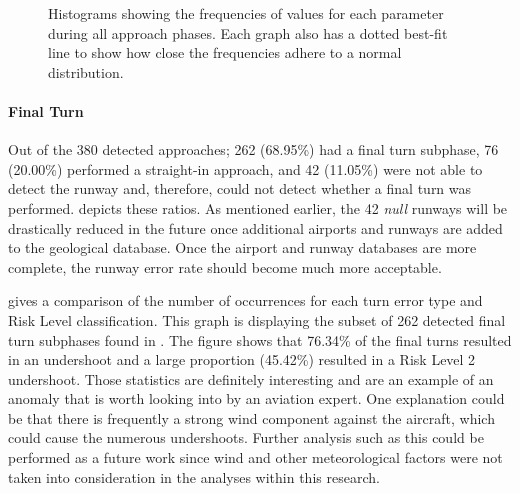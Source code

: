     \begin{figure}
    	\centering
        \hfill%
        
        \hfill%
        \caption{Histograms showing the frequencies of values for each parameter during all approach phases.  Each graph also has a dotted best-fit line to show how close the frequencies adhere to a normal distribution.}
        \label{fig:approach_histograms}
    \end{figure}
    
    
        \paragraph{Final Turn}
        
        	Out of the 380 detected approaches; 262 (68.95\%) had a final turn subphase, 76 (20.00\%) performed a straight-in approach, and 42 (11.05\%) were not able to detect the runway and, therefore, could not detect whether a final turn was performed.   depicts these ratios.  As mentioned earlier, the 42 \textit{null} runways will be drastically reduced in the future once additional airports and runways are added to the geological database.  Once the airport and runway databases are more complete, the runway error rate should become much more acceptable.
            
             gives a comparison of the number of occurrences for each turn error type and Risk Level classification.  This graph is displaying the subset of 262 detected final turn subphases found in .  The figure shows that 76.34\% of the final turns resulted in an undershoot and a large proportion (45.42\%) resulted in a Risk Level 2 undershoot.  Those statistics are definitely interesting and are an example of an anomaly that is worth looking into by an aviation expert.  One explanation could be that there is frequently a strong wind component against the aircraft, which could cause the numerous undershoots.  Further analysis such as this could be performed as a future work since wind and other meteorological factors were not taken into consideration in the analyses within this research.
            
